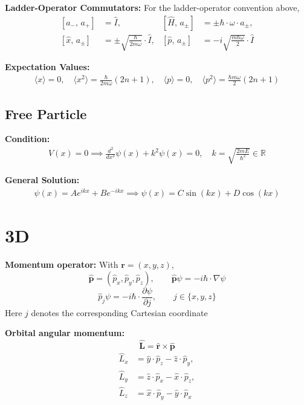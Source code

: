 \documentclass[12pt]{article}
\begin{document}
\textbf{Ladder-Operator Commutators:}
For the ladder-operator convention above,
\begin{align*}
    \left[a_-,\,a_+\right]&=\hat I,
    &\left[\hat H,\,a_\pm\right]&=\pm\hbar\cdot\omega\cdot a_\pm,\\
    \left[\hat x,\,a_\pm\right]&=\pm\sqrt{\frac{\hbar}{2m\omega}}\cdot\hat I,
    &\left[\hat p,\,a_\pm\right]&=-i\sqrt{\frac{m\hbar\omega}{2}}\cdot\hat I
\end{align*}

\textbf{Expectation Values: }
\begin{align}
    \langle x \rangle = 0, \quad \langle x^2 \rangle = \frac{\hbar}{2m\omega}(2n+1), \quad \langle p \rangle = 0, \quad \langle p^2 \rangle = \frac{\hbar m\omega}{2}(2n+1)
\end{align}

\subsection{Free Particle } 

\textbf{Condition: } 
\begin{align}
    V(x) = 0 \implies \frac{d^2}{dx^2} \psi(x) + k^2 \psi(x) = 0, \quad k = \sqrt{\frac{2mE}{\hbar^2} } \in \mathbb{R} 
\end{align} 

\textbf{General Solution: }
\begin{align}
    \psi(x) = A e^{ikx} + B e^{-ikx} \implies \psi(x) = C \sin(kx) + D \cos(kx) 
\end{align} 

\section{3D}

\textbf{Momentum operator:}
With $\boldsymbol r=(x,y,z)$,
\[
  \hat{\boldsymbol p}=(\hat p_x,\hat p_y,\hat p_z),\qquad
  \hat{\boldsymbol p}\psi=-i\hbar\cdot\nabla\psi
\]
\[
  \hat p_j\psi=-i\hbar\cdot\frac{\partial\psi}{\partial j},\qquad j\in\{x,y,z\}
\]
Here $j$ denotes the corresponding Cartesian coordinate

\textbf{Orbital angular momentum:}
\[
  \hat{\boldsymbol L}=\hat{\boldsymbol r}\times\hat{\boldsymbol p}
\]
\[
  \begin{aligned}
    \hat L_x&=\hat y\cdot\hat p_z-\hat z\cdot\hat p_y,\\
    \hat L_y&=\hat z\cdot\hat p_x-\hat x\cdot\hat p_z,\\
    \hat L_z&=\hat x\cdot\hat p_y-\hat y\cdot\hat p_x
  \end{aligned}
\]
\end{document}
